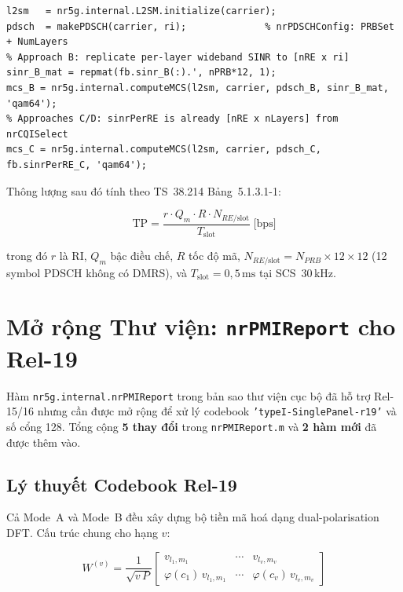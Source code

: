 \documentclass[11pt,a4paper]{article}
\begin{document}
\begin{lstlisting}[style=matlab, caption={MCS computation via L2SM in csirs\_computeMetrics.m}]
l2sm   = nr5g.internal.L2SM.initialize(carrier);
pdsch  = makePDSCH(carrier, ri);              % nrPDSCHConfig: PRBSet + NumLayers
% Approach B: replicate per-layer wideband SINR to [nRE x ri]
sinr_B_mat = repmat(fb.sinr_B(:).', nPRB*12, 1);
mcs_B = nr5g.internal.computeMCS(l2sm, carrier, pdsch_B, sinr_B_mat, 'qam64');
% Approaches C/D: sinrPerRE is already [nRE x nLayers] from nrCQISelect
mcs_C = nr5g.internal.computeMCS(l2sm, carrier, pdsch_C, fb.sinrPerRE_C, 'qam64');
\end{lstlisting}

Thông lượng sau đó tính theo TS~38.214 Bảng~5.1.3.1-1:

\begin{equation}
\text{TP} = \frac{r \cdot Q_m \cdot R \cdot N_{RE/\text{slot}}}{T_{\text{slot}}}
\;\text{[bps]}
\end{equation}

trong đó $r$ là RI, $Q_m$ bậc điều chế, $R$ tốc độ mã,
$N_{RE/\text{slot}} = N_{PRB}\times12\times12$ (12 symbol PDSCH không có DMRS),
và $T_{\text{slot}} = 0{,}5\,\text{ms}$ tại SCS~30\,kHz.

\FloatBarrier
\section{Mở rộng Thư viện: \texttt{nrPMIReport} cho Rel-19}

Hàm \texttt{nr5g.internal.nrPMIReport} trong bản sao thư viện cục bộ đã hỗ trợ
Rel-15/16 nhưng cần được mở rộng để xử lý codebook \texttt{'typeI-SinglePanel-r19'}
và số cổng 128. Tổng cộng \textbf{5 thay đổi} trong \texttt{nrPMIReport.m} và
\textbf{2 hàm mới} đã được thêm vào.

\subsection{Lý thuyết Codebook Rel-19}

Cả Mode~A và Mode~B đều xây dựng bộ tiền mã hoá dạng dual-polarisation DFT.
Cấu trúc chung cho hạng $v$:

\begin{equation}
W^{(v)} = \frac{1}{\sqrt{v\,P}}
\begin{bmatrix}
  v_{l_1,m_1} & \cdots & v_{l_v,m_v} \\
  \varphi(c_1)\,v_{l_1,m_1} & \cdots & \varphi(c_v)\,v_{l_v,m_v}
\end{bmatrix}
\label{eq:precoder_general}
\end{equation}
\end{document}
